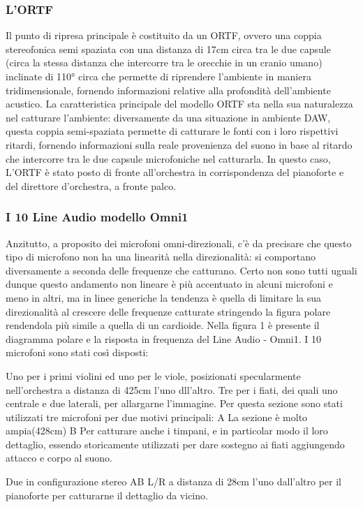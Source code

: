 \subsubsection{L'ORTF}
Il punto di ripresa principale è costituito da un ORTF, ovvero una coppia stereofonica semi spaziata con una distanza di 17cm circa tra le due capsule (circa la stessa distanza che intercorre tra le orecchie in un cranio umano) inclinate di 110° circa che permette di riprendere l'ambiente in maniera tridimensionale, fornendo informazioni relative alla profondità dell'ambiente acustico.
La caratteristica principale del modello ORTF sta nella sua naturalezza nel catturare l'ambiente: diversamente da una situazione in ambiente DAW, questa coppia semi-spaziata permette di catturare le fonti con i loro rispettivi ritardi, fornendo informazioni sulla reale provenienza del suono in base al ritardo che intercorre tra le due capsule microfoniche nel catturarla.
In questo caso, L'ORTF è stato posto di fronte all'orchestra in corrispondenza del pianoforte e del direttore d'orchestra, a fronte palco.

\subsubsection {I 10 Line Audio modello Omni1}
Anzitutto, a proposito dei microfoni omni-direzionali, c'è da precisare che questo tipo di microfono non ha una linearità nella direzionalità: si comportano diversamente a seconda delle frequenze che catturano. Certo non sono tutti uguali dunque questo andamento non lineare è più accentuato in alcuni microfoni e meno in altri, ma in linee generiche la tendenza è quella di limitare la sua direzionalità al crescere delle frequenze catturate stringendo la figura polare rendendola più simile a quella di un cardioide. Nella figura 1 è presente il diagramma polare e la risposta in frequenza del Line Audio - Omni1.
I 10 microfoni sono stati così disposti:

Uno per i primi violini ed uno per le viole, posizionati specularmente nell'orchestra a distanza di 425cm l'uno dll'altro.
Tre per i fiati, dei quali uno centrale e due laterali, per allargarne l'immagine. Per questa sezione sono stati utilizzati tre microfoni per due motivi principali:
A La sezione è molto ampia(428cm)
B Per catturare anche i timpani, e in particolar modo il loro dettaglio, essendo storicamente utilizzati per dare sostegno ai fiati aggiungendo attacco e corpo al  suono.

Due in configurazione stereo AB L/R a distanza di 28cm l'uno dall'altro per il pianoforte per catturarne il dettaglio da vicino.

